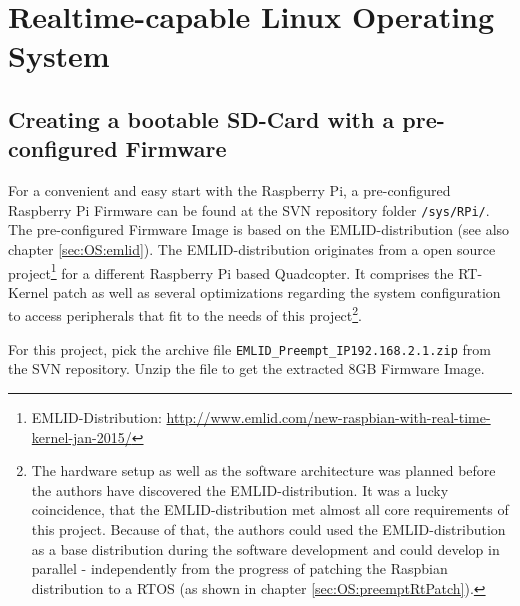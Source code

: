 \chapter{Realtime-capable Linux Operating System}
\label{sec:OS}

\section{Creating a bootable SD-Card with a pre-configured Firmware}
\label{sec:OS:sdCardSetup}

For a convenient and easy start with the Raspberry Pi, a pre-configured Raspberry Pi Firmware can be found at the SVN repository folder \texttt{/sys/RPi/}. The pre-configured Firmware Image is based on the EMLID-distribution (see also chapter \ref{sec:OS:emlid}). The EMLID-distribution originates from a open source project\footnote{EMLID-Distribution: \url{http://www.emlid.com/new-raspbian-with-real-time-kernel-jan-2015/}} for a different Raspberry Pi based Quadcopter. It comprises the RT-Kernel patch as well as several optimizations regarding the system configuration to access peripherals that fit to the needs of this project\footnote{The hardware setup as well as the software architecture was planned before the authors have discovered the EMLID-distribution. It was a lucky coincidence, that the EMLID-distribution met almost all core requirements of this project. Because of that, the authors could used the EMLID-distribution as a base distribution during the software development and could develop in parallel - independently from the progress of patching the Raspbian distribution to a RTOS (as shown in chapter \ref{sec:OS:preemptRtPatch}).}.

For this project, pick the archive file \texttt{EMLID\_Preempt\_IP192.168.2.1.zip} from the SVN repository. Unzip the file to get the extracted 8GB Firmware Image.

